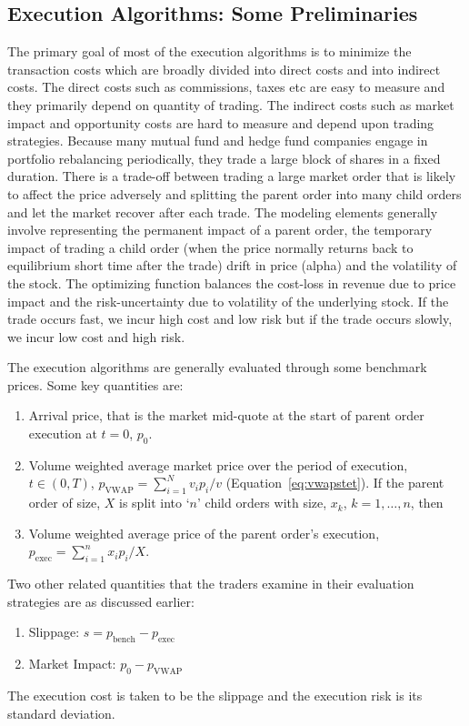 \subsection{Execution Algorithms: Some Preliminaries}


The primary goal of most of the execution algorithms is to minimize the transaction costs which are broadly divided into direct costs and into indirect costs. The direct costs such as commissions, taxes etc are easy to measure and they primarily depend on quantity of trading. The indirect costs such as market impact and opportunity costs are hard to measure and depend upon trading strategies. Because many mutual fund and hedge fund companies engage in portfolio rebalancing periodically, they trade a large block of shares in a fixed duration. There is a trade-off between trading a large market order that is likely to affect the price adversely and splitting the parent order into many child orders and let the market recover after each trade. The modeling elements generally involve representing the permanent impact of a parent order, the temporary impact of trading a child order (when the price normally returns back to equilibrium short time after the trade) drift in price (alpha) and the volatility of the stock. The optimizing function balances the cost-loss in revenue due to price impact and the risk-uncertainty due to volatility of the underlying stock. If the trade occurs fast, we incur high cost and low risk but if the trade occurs slowly, we incur low cost and high risk.


The execution algorithms are generally evaluated through some benchmark prices. Some key quantities are:
	\begin{enumerate}[--]
	\item Arrival price, that is the market mid-quote at the start of parent order execution at $t= 0$, $p_0$.
	\item Volume weighted average market price over the period of execution, $t \in (0,T)$, $p_{\text{VWAP}}= \sum_{i=1}^N v_ip_i/v$ (Equation~\ref{eq:vwapstet}). \twomedskip
	If the parent order of size, $X$ is split into `$n$' child orders with size, $x_k$, $k=1,\ldots,n$, then
	\item Volume weighted average price of the parent order's execution, $p_{\text{exec}}= \sum_{i=1}^n x_ip_i/X$. 
	\end{enumerate}
	
Two other related quantities that the traders examine in their evaluation strategies are as discussed earlier:
	\begin{enumerate}[--]
	\item Slippage: $s= p_{\text{bench}} - p_{\text{exec}}$
	\item Market Impact: $p_0 - p_{\text{VWAP}}$
	\end{enumerate}
The execution cost is taken to be the slippage and the execution risk is its standard deviation. 


